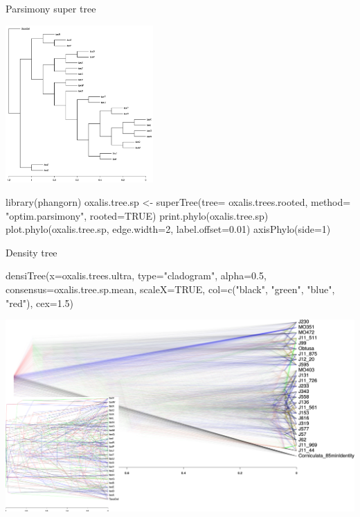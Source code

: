 \documentclass[compress, ucs, xelatex, 11pt, xcolor=svgnames,
  hyperref={
    bookmarks=true,
    unicode=true,
    colorlinks=true,
    pdftitle={Molecular data in R},
    plainpages=false,
    pdfauthor={Vojtech Zeisek},
    pdfsubject={Course about phylogeny and evolution in R},
    pdfcreator={XeLaTeX},
    pdfkeywords={R, evolution, phylogeny, molecular data},
    linkcolor=Tomato,
    anchorcolor=SaddleBrown,
    citecolor=Goldenrod,
    filecolor=DarkMagenta,
    menucolor=Sienna,
    urlcolor=DarkTurquoise,
    pdftex},
  url={hyphens, lowtilde} %
  ]{beamer}
\begin{document}
\begin{frame}[fragile]{Parsimony super tree}
\begin{multicols}{2}
  \includegraphics[height=6cm]{oxalis-pars.png}
  \begin{spluscode}
    library(phangorn)
    oxalis.tree.sp <- superTree(tree=
      oxalis.trees.rooted, method=
      "optim.parsimony", rooted=TRUE)
    print.phylo(oxalis.tree.sp)
    plot.phylo(oxalis.tree.sp,
      edge.width=2, label.offset=0.01)
    axisPhylo(side=1)
  \end{spluscode}
\end{multicols}
\end{frame}

\begin{frame}[fragile]{Density tree}
  \begin{spluscode}
    densiTree(x=oxalis.trees.ultra, type="cladogram", alpha=0.5,
      consensus=oxalis.tree.sp.mean, scaleX=TRUE, col=c("black",
      "green", "blue", "red"), cex=1.5)
  \end{spluscode}
  \begin{center}
    \includegraphics[width=\textwidth-1.5cm]{oxalis_density_good.png}
  \end{center}
\end{frame}
\end{document}
